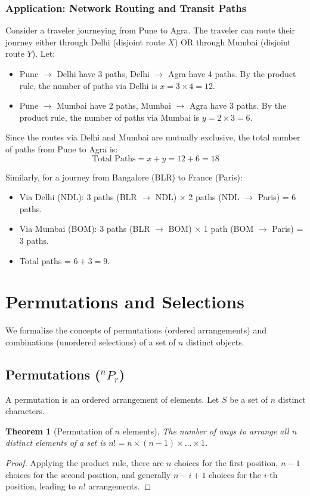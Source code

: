 \documentclass[10pt,journal,compsoc,onecolumn]{IEEEtran}
\newtheorem{theorem}{Theorem}
\begin{document}
\subsubsection{Application: Network Routing and Transit Paths}
Consider a traveler journeying from Pune to Agra. The traveler can route their journey either through Delhi (disjoint route $X$) OR through Mumbai (disjoint route $Y$). Let:
\begin{itemize}
    \item Pune $\to$ Delhi have 3 paths, Delhi $\to$ Agra have 4 paths. By the product rule, the number of paths via Delhi is $x = 3 \times 4 = 12$.
    \item Pune $\to$ Mumbai have 2 paths, Mumbai $\to$ Agra have 3 paths. By the product rule, the number of paths via Mumbai is $y = 2 \times 3 = 6$.
\end{itemize}
Since the routes via Delhi and Mumbai are mutually exclusive, the total number of paths from Pune to Agra is:
\[
\text{Total Paths} = x + y = 12 + 6 = 18
\]

Similarly, for a journey from Bangalore (BLR) to France (Paris):
\begin{itemize}
    \item Via Delhi (NDL): 3 paths (BLR $\to$ NDL) $\times$ 2 paths (NDL $\to$ Paris) = 6 paths.
    \item Via Mumbai (BOM): 3 paths (BLR $\to$ BOM) $\times$ 1 path (BOM $\to$ Paris) = 3 paths.
    \item Total paths = $6 + 3 = 9$.
\end{itemize}

\section{Permutations and Selections}
\label{sec:permutations}

We formalize the concepts of permutations (ordered arrangements) and combinations (unordered selections) of a set of $n$ distinct objects.

\subsection{Permutations ($^nP_r$)}
A permutation is an ordered arrangement of elements. Let $S$ be a set of $n$ distinct characters. 

\begin{theorem}[Permutation of $n$ elements]
The number of ways to arrange all $n$ distinct elements of a set is $n! = n \times (n-1) \times \dots \times 1$.
\end{theorem}
\begin{proof}
Applying the product rule, there are $n$ choices for the first position, $n-1$ choices for the second position, and generally $n-i+1$ choices for the $i$-th position, leading to $n!$ arrangements.
\end{proof}
\end{document}
